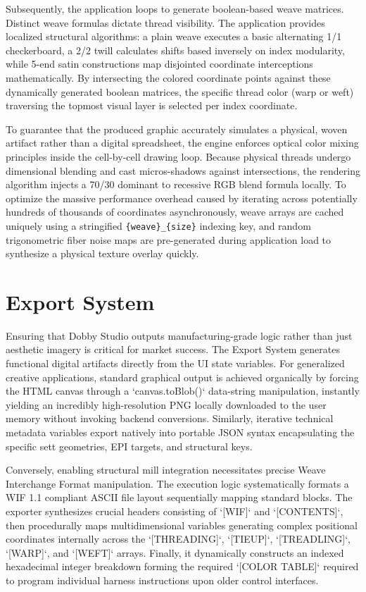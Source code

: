 Subsequently, the application loops to generate boolean-based weave matrices. Distinct weave formulas dictate thread visibility. The application provides localized structural algorithms: a plain weave executes a basic alternating 1/1 checkerboard, a 2/2 twill calculates shifts based inversely on index modularity, while 5-end satin constructions map disjointed coordinate interceptions mathematically. By intersecting the colored coordinate points against these dynamically generated boolean matrices, the specific thread color (warp or weft) traversing the topmost visual layer is selected per index coordinate.

To guarantee that the produced graphic accurately simulates a physical, woven artifact rather than a digital spreadsheet, the engine enforces optical color mixing principles inside the cell-by-cell drawing loop. Because physical threads undergo dimensional blending and cast micros-shadows against intersections, the rendering algorithm injects a 70/30 dominant to recessive RGB blend formula locally. To optimize the massive performance overhead caused by iterating across potentially hundreds of thousands of coordinates asynchronously, weave arrays are cached uniquely using a stringified \texttt{\{weave\}\_\{size\}} indexing key, and random trigonometric fiber noise maps are pre-generated during application load to synthesize a physical texture overlay quickly.

\section{Export System}
Ensuring that Dobby Studio outputs manufacturing-grade logic rather than just aesthetic imagery is critical for market success. The Export System generates functional digital artifacts directly from the UI state variables. For generalized creative applications, standard graphical output is achieved organically by forcing the HTML canvas through a `canvas.toBlob()` data-string manipulation, instantly yielding an incredibly high-resolution PNG locally downloaded to the user memory without invoking backend conversions. Similarly, iterative technical metadata variables export natively into portable JSON syntax encapsulating the specific sett geometries, EPI targets, and structural keys.

Conversely, enabling structural mill integration necessitates precise Weave Interchange Format manipulation. The execution logic systematically formats a WIF 1.1 compliant ASCII file layout sequentially mapping standard blocks. The exporter synthesizes crucial headers consisting of `[WIF]` and `[CONTENTS]`, then procedurally maps multidimensional variables generating complex positional coordinates internally across the `[THREADING]`, `[TIEUP]`, `[TREADLING]`, `[WARP]`, and `[WEFT]` arrays. Finally, it dynamically constructs an indexed hexadecimal integer breakdown forming the required `[COLOR TABLE]` required to program individual harness instructions upon older control interfaces.

